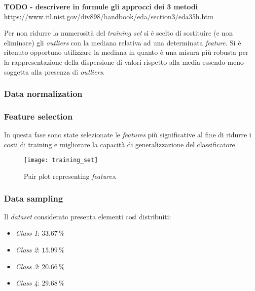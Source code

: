                        \textbf{TODO - descrivere in formule gli approcci dei 3 metodi}
                        https://www.itl.nist.gov/div898/handbook/eda/section3/eda35h.htm
                        
                        Per non ridurre la numerosità del \textit{training set} si è scelto di sostituire (e non eliminare) gli \textit{outliers} con la mediana relativa ad una determinata \textit{feature}. Si è ritenuto opportuno utilizzare la mediana in quanto è una misura più robusta per la rappresentazione della dispersione di valori rispetto alla media essendo meno soggetta alla presenza di \textit{outliers}.                        
                
                \subsubsection{Data normalization}
                
                \subsubsection{Feature selection}
                
                        In questa fase sono state selezionate le \textit{features} più significative al fine di ridurre i costi di training e migliorare la capacità di generalizzazione del classificatore.
                        
                        \begin{figure}[!h]
                            \centering
                            \texttt{[image: training\_set]}
                            \caption{Pair plot representing \textit{features}.}
                            \label{fig:training_set_pairplot}
                        \end{figure}
                        \clearpage
                
                \subsubsection{Data sampling} 
                
                        Il \textit{dataset} considerato presenta elementi così distribuiti:
                        \begin{itemize}
                                \item \textit{Class 1}: $33.67 \, \%$
                                \item \textit{Class 2}: $15.99 \, \%$
                                \item \textit{Class 3}: $20.66 \, \%$
                                \item \textit{Class 4}: $29.68 \, \%$
                        \end{itemize}
                        
